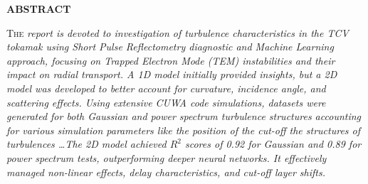 \documentclass[11pt,a4paper,openany]{report}
\begin{document}
\begin{titlepage}
\begin{center}

    \end{center}

\end{titlepage}

\newpage
\vspace*{2cm}
\renewcommand{\contentsname}{TABLE OF CONTENTS} %

\begin{multicols}{2}
    \renewcommand{\baselinestretch}{1.7}\normalsize %
    {\small \tableofcontents} %



    \renewcommand{\baselinestretch}{1.0}\normalsize

\end{multicols}
\newpage


\begin{center}
    \textbf{ABSTRACT}
\end{center}
\fontsize{9}{10}\selectfont

\lettrine[loversize=.30,findent=.21em,nindent=2.5pt]{\color{black} T}{he} \emph{ report is devoted
    to investigation of turbulence characteristics in the TCV tokamak using Short Pulse Reflectometry diagnostic and Machine Learning approach, focusing on Trapped Electron Mode (TEM) instabilities and their impact on radial transport. A 1D model initially provided insights, but a 2D model was developed to better account for curvature, incidence angle, and scattering effects. Using extensive CUWA code simulations, datasets were generated for both Gaussian and power spectrum turbulence structures accounting for various simulation parameters like the position of the cut-off the structures of turbulences \dots The 2D model achieved $R^2$ scores of 0.92 for Gaussian and 0.89 for power spectrum tests, outperforming deeper neural networks. It effectively managed non-linear effects, delay characteristics, and cut-off layer shifts.}
\fontsize{10}{10}\selectfont
\end{document}
